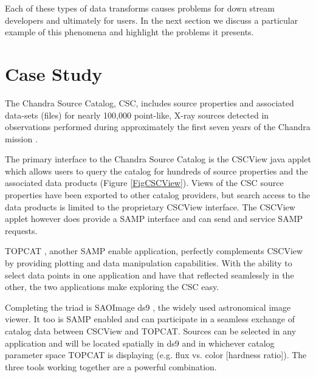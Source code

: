 Each of these types of data transforms causes problems for down stream
developers and ultimately for users. In the next section we discuss a
particular example of this phenomena and highlight the problems it presents.

\section{Case Study}



The Chandra Source Catalog, CSC,  includes source properties and 
associated data-sets (files) for nearly 100,000 point-like, X-ray sources 
detected in observations performed during approximately the first 
seven years of the Chandra mission \citep{2010ApJS..189...37E}. 


The primary interface to the Chandra Source Catalog is the CSCView java 
applet \citep{2011ASPC..442..649V}
 which allows users to query the 
catalog for hundreds of source properties and the associated
 data products (Figure \ref{FigCSCView}).
Views of the CSC source properties have been 
exported to other catalog providers, but search access to the data 
products is limited to the proprietary CSCView interface.  The CSCView 
applet however does provide a SAMP \citep{2011arXiv1110.0528T} interface and can send and 
service SAMP requests.

TOPCAT \citep{2005ASPC..347...29T}, another SAMP enable application, perfectly complements CSCView 
by providing
plotting and data manipulation capabilities.  With the ability to select
data points in one application and have that reflected seamlessly in the other,
the two applications make exploring the CSC easy.  

Completing the triad is SAOImage ds9 \citep{2003ASPC..295..489J}, the widely used astronomical image viewer. 
It too is SAMP enabled and can participate in a seamless exchange 
of catalog data between CSCView and TOPCAT.  Sources can be selected in any
application and will be located spatially in ds9 and in whichever catalog
parameter space TOPCAT is displaying (e.g. flux vs. color [hardness ratio]).
The three tools working together are a powerful combination.  

